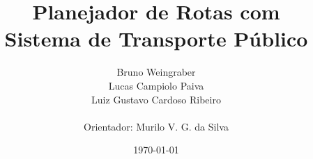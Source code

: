\documentclass{beamer}
\title{Planejador de Rotas com \\ Sistema de Transporte Público}
\author{Bruno Weingraber \\ Lucas Campiolo Paiva \\ Luiz Gustavo Cardoso Ribeiro \\ ~ \\ Orientador: Murilo V. G. da Silva}
\institute{Universidade Tecnológica Federal do Paraná}
\date{\today}
\begin{document}
\frame{\titlepage}


\frame{\tableofcontents}







\end{document}
